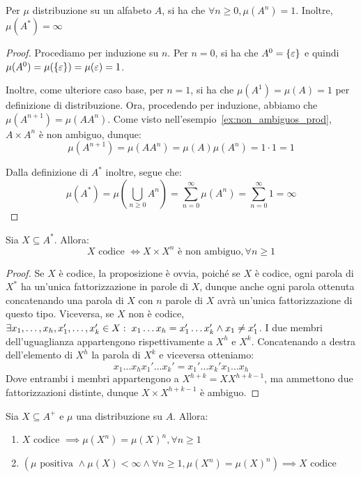 \begin{proposition}[label=prop:A_power_mesure_1]{}
  Per \(\mu\) distribuzione su un alfabeto \(A\), si ha che \(\forall n \geq 0, \mu(A^n) = 1\).
  Inoltre, \(\mu(A^*) = \infty\)
\end{proposition}
\begin{proof}
  Procediamo per induzione su \(n\).
  Per \(n=0\), si ha che \(A^0 = \set{\varepsilon}\) e quindi \(\mu(A^0) = \mu(\set{\varepsilon}) = \mu(\varepsilon) = 1\).

  Inoltre, come ulteriore caso base, per \(n=1\), si ha che \(\mu(A^1) = \mu(A) = 1\) per definizione di distribuzione.
  Ora, procedendo per induzione, abbiamo che \(\mu(A^{n+1}) = \mu(AA^n)\).
  Come visto nell'esempio~\ref{ex:non_ambiguos_prod}, \(A \times A^n\) è non ambiguo, dunque:
  \[\mu(A^{n+1}) = \mu(AA^n) = \mu(A)\mu(A^n) = 1 \cdot 1 = 1 \]

  Dalla definizione di \(A^*\) inoltre, segue che:
  \[\mu(A^*) = \mu(\bigcup_{n\geq0} A^n) = \sum_{n=0}^{\infty} \mu(A^n) = \sum_{n=0}^{\infty} 1 = \infty\]
\end{proof}

\begin{proposition}[label=prop:code_iff_not_ambiguos]{}
  Sia \(X \subseteq A^*\). Allora:
  \[X \text{ codice } \iff X\times X^n \text{ è non ambiguo},\forall n \geq 1\]
\end{proposition}
\begin{proof}
  Se \(X\) è codice, la proposizione è ovvia, poiché se \(X\) è codice, ogni parola di \(X^*\) ha un'unica fattorizzazione in parole di \(X\), dunque anche ogni parola ottenuta concatenando una parola di \(X\) con \(n\) parole di \(X\) avrà un'unica fattorizzazione di questo tipo.
  Viceversa, se \(X\) non è codice, \(\exists x_1,\ldots,x_h,x_1',\ldots,x_k' \in X :\; x_1\ldots x_h = x_1'\ldots x_k' \land x_1 \neq x_1'\).
  I due membri dell'uguaglianza appartengono rispettivamente a \(X^h\) e \(X^k\).
  Concatenando a destra dell'elemento di \(X^h\) la parola di \(X^k\) e viceversa otteniamo:
  \[x_1\ldots x_h x_1'\ldots x_k' = x_1'\ldots x_k' x_1\ldots x_h\]
  Dove entrambi i membri appartengono a \(X^{h+k} = X  X^{h+k-1}\), ma ammettono due fattorizzazioni distinte, dunque \(X \times X^{h+k-1}\) è ambiguo.
\end{proof}

\begin{proposition}[label=prop:code_implies_equal_mesures_of_powers]{}
  Sia \(X \subseteq A^+\) e \(\mu\) una distribuzione su \(A\). Allora:
  \begin{enumerate}
    \item \(X \text{ codice } \implies \mu(X^n) = {\mu(X)}^n, \forall n \geq 1\)\label{item:code_implies_measure_product}
    \item \((\mu \text{ positiva } \land \mu(X) < \infty \land \forall n \geq 1, \mu(X^n) = {\mu(X)}^n )\implies X \text{ codice}\)\label{item:measure_product_implies_code}
  \end{enumerate}
\end{proposition}

